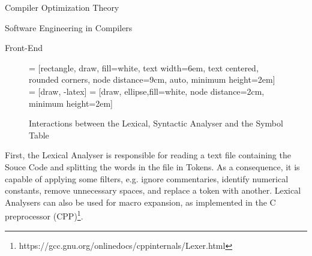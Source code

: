 \begin{section}{Compiler Optimization Theory}
\begin{section}{Software Engineering in Compilers}
\begin{subsection}{Front-End}
\begin{figure}
 = [rectangle, draw, fill=white,
    text width=6em, text centered, rounded corners, node distance=9cm, auto, minimum height=2em]
 = [draw, -latex]
 = [draw, ellipse,fill=white, node distance=2cm,
    minimum height=2em]

\begin{center}
\end{center}

\caption{Interactions between the Lexical, Syntactic Analyser and the Symbol Table}
\label{fig:lexico_sintatico}
\end{figure}


First, the Lexical Analyser is responsible for reading a text file containing
the Souce Code and splitting the words in the file in Tokens. As a consequence,
it is capable of applying some filters, e.g. ignore commentaries, identify
numerical constants, remove unnecessary spaces, and replace a token with
another.  Lexical Analysers can also be used for macro expansion, as
implemented in the C preprocessor
(CPP)\footnote{https://gcc.gnu.org/onlinedocs/cppinternals/Lexer.html}.


\end{subsection}
\end{section}
\end{section}
